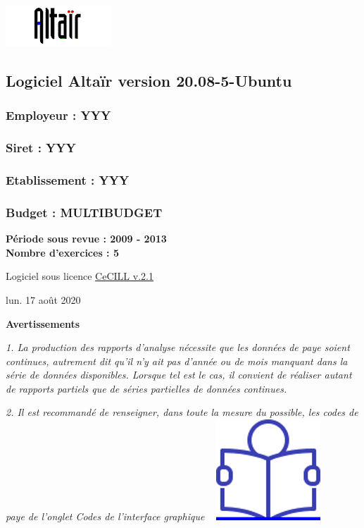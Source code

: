 \includegraphics{icones/altair.png}

\hypertarget{logiciel-altair-version-20.08-5-ubuntu}{%
\subsection{Logiciel Altaïr version
20.08-5-Ubuntu}\label{logiciel-altair-version-20.08-5-ubuntu}}

\hypertarget{employeur-yyy}{%
\subsubsection{Employeur : YYY}\label{employeur-yyy}}

\hypertarget{siret-yyy}{%
\subsubsection{Siret : YYY}\label{siret-yyy}}

\hypertarget{etablissement-yyy}{%
\subsubsection{Etablissement : YYY}\label{etablissement-yyy}}

\hypertarget{budget-multibudget}{%
\subsubsection{Budget : MULTIBUDGET}\label{budget-multibudget}}

\textbf{Période sous revue : 2009 - 2013 }\\
\textbf{Nombre d'exercices : 5 }

Logiciel sous licence \href{../Docs/LICENCE.html}{CeCILL v.2.1}

lun. 17 août 2020

\textbf{Avertissements}

\emph{1. La production des rapports d'analyse nécessite que les données
de paye soient continues, autrement dit qu'il n'y ait pas d'année ou de
mois manquant dans la série de données disponibles. Lorsque tel est le
cas, il convient de réaliser autant de rapports partiels que de séries
partielles de données continues.}

\emph{2. Il est recommandé de renseigner, dans toute la mesure du
possible, les codes de paye de l'onglet Codes de l'interface graphique}
~
\href{../Docs/Notices/fiche_onglet_codes.odt}{\includegraphics{icones/Notice.png}}

